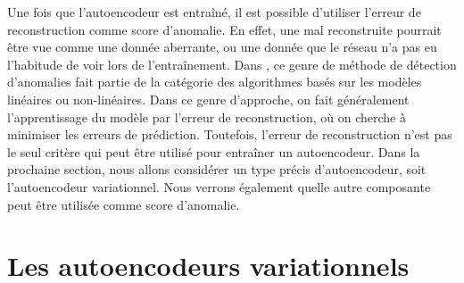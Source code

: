 Une fois que l'autoencodeur est entraîné, il est possible d'utiliser l'erreur de reconstruction comme score d'anomalie. En effet, une \DIFdelbegin {}\DIFdelend \DIFaddbegin {}\DIFaddend mal reconstruite pourrait être vue comme une donnée aberrante, ou une donnée que le réseau n'a pas eu l'habitude de voir lors de l'entraînement. Dans  \cite{10.5555/3086742}, ce genre de méthode de détection d'anomalies fait partie de la catégorie des algorithmes basés sur les modèles linéaires ou non-linéaires. Dans ce genre d'approche, on fait généralement l'apprentissage du modèle par l'erreur de reconstruction, où \DIFaddbegin {}\DIFaddend on cherche à minimiser les erreurs de prédiction. Toutefois, l'erreur de reconstruction n'est pas le seul critère qui peut être utilisé pour entraîner un autoencodeur. Dans la prochaine section, nous allons considérer un type précis d'autoencodeur, soit l'autoencodeur variationnel. Nous verrons également quelle autre composante peut être utilisée comme score d'anomalie.

\section{Les autoencodeurs variationnels} \label{background-vae}


